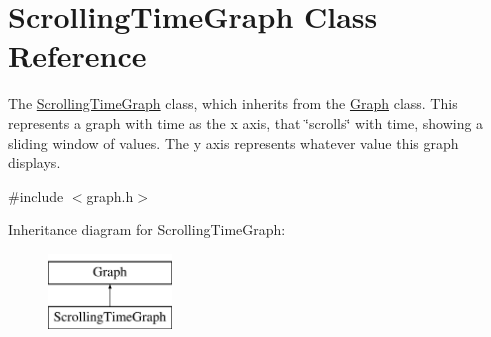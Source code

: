 \hypertarget{class_scrolling_time_graph}{}\section{Scrolling\+Time\+Graph Class Reference}
\label{class_scrolling_time_graph}


The \hyperlink{class_scrolling_time_graph}{Scrolling\+Time\+Graph} class, which inherits from the \hyperlink{class_graph}{Graph} class. This represents a graph with time as the x axis, that \char`\"{}scrolls\char`\"{} with time, showing a sliding window of values. The y axis represents whatever value this graph displays.  




{\ttfamily \#include $<$graph.\+h$>$}

Inheritance diagram for Scrolling\+Time\+Graph\+:\begin{figure}[H]
\begin{center}
\leavevmode
\includegraphics[height=2.000000cm]{class_scrolling_time_graph}
\end{center}
\end{figure}
